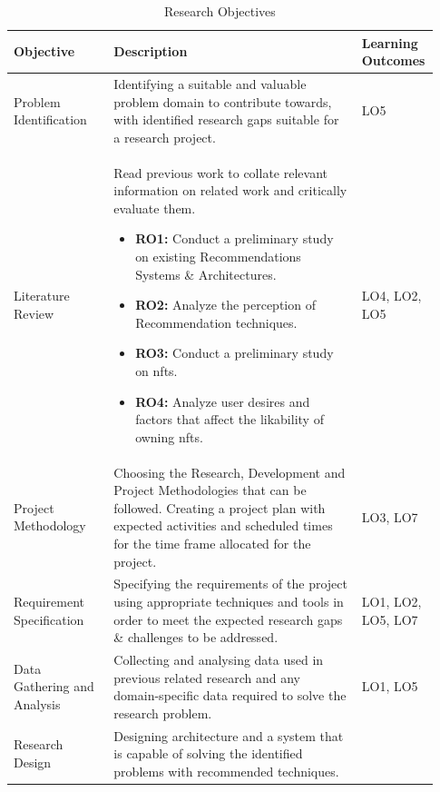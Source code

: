 \documentclass[a4paper, 12pt, oneside]{report}
\begin{document}
\begin{longtable}{| p{0.23\linewidth} | p{0.58\linewidth}| p{0.12\linewidth}|}
\caption{Research Objectives}
\label{tab:research-objectives-table}\\
\hline
Objective &   Description & Learning Outcomes  \\ 
\hline
Problem Identification & Identifying a suitable and valuable problem domain to contribute towards, with identified research gaps suitable for a research project.
& LO5 \\
\hline
Literature Review & Read previous work to collate relevant information on related work and critically evaluate them.
\begin{itemize}
\item \textbf{RO1:} Conduct a preliminary study on existing Recommendations Systems \& Architectures.
\item \textbf{RO2:} Analyze the perception of Recommendation techniques.
\item \textbf{RO3:} Conduct a preliminary study on \Gls{nft}s.
\item \textbf{RO4:} Analyze user desires and factors that affect the likability of owning \Gls{nft}s.
\end{itemize}
& LO4, LO2, LO5 \\
\hline
Project Methodology & Choosing the Research, Development and Project Methodologies that can be followed. Creating a project plan with expected activities and scheduled times for the time frame allocated for the project.
& LO3, LO7 \\
\hline
Requirement Specification & Specifying the requirements of the project using appropriate techniques and tools in order to meet the expected research gaps \& challenges to be addressed.
& LO1, LO2, LO5, LO7\\
\hline
Data Gathering and Analysis & Collecting and analysing data used in previous related research and any domain-specific data required to solve the research problem.  
& LO1, LO5 \\
\hline
Research Design & Designing architecture and a system that is capable of solving the identified problems with recommended techniques.

\end{longtable}
\end{document}
